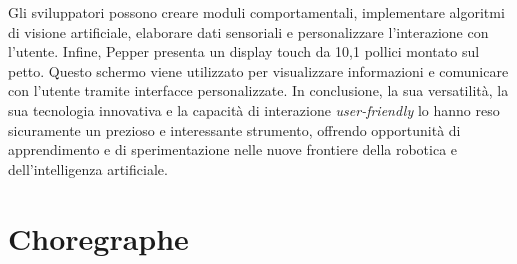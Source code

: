 \begin{sloppypar}
{Gli sviluppatori possono creare moduli comportamentali, implementare algoritmi di visione artificiale, elaborare dati sensoriali e personalizzare l'interazione con l'utente.
Infine, Pepper presenta un display touch da 10,1 pollici montato sul petto. Questo schermo viene utilizzato per visualizzare informazioni e comunicare con l'utente tramite interfacce personalizzate.
\newline
In conclusione, la sua versatilità, la sua tecnologia innovativa e la capacità
di interazione \textit{user-friendly} lo hanno reso sicuramente un prezioso e interessante
strumento, offrendo opportunità
di apprendimento e di sperimentazione nelle nuove frontiere della robotica e
dell’intelligenza artificiale.
}
\section{Choregraphe}
\fontsize{12}{19}
\end{sloppypar}
